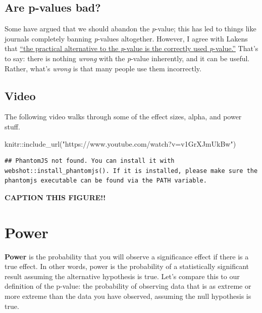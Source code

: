 \documentclass[
]{book}
\newenvironment{Shaded}{\begin{snugshade}}{\end{snugshade}}
\newcommand{\FunctionTok}[1]{\textcolor[rgb]{0.00,0.00,0.00}{#1}}
\newcommand{\NormalTok}[1]{#1}
\newcommand{\SpecialCharTok}[1]{\textcolor[rgb]{0.00,0.00,0.00}{#1}}
\newcommand{\StringTok}[1]{\textcolor[rgb]{0.31,0.60,0.02}{#1}}
\begin{document}
\hypertarget{are-p-values-bad}{%
\subsection{Are p-values bad?}\label{are-p-values-bad}}

Some have argued that we should abandon the \emph{p}-value; this has led to things like journals completely banning \emph{p}-values altogether. However, I agree with Lakens that \href{https://psyarxiv.com/shm8v/}{``the practical alternative to the \emph{p}-value is the correctly used \emph{p}-value.''} That's to say: there is nothing \emph{wrong} with the \emph{p}-value inherently, and it can be useful. Rather, what's \emph{wrong} is that many people use them incorrectly.

\hypertarget{video}{%
\subsection{Video}\label{video}}

The following video walks through some of the effect sizes, alpha, and power stuff.

\begin{Shaded}
\begin{Highlighting}[]
\NormalTok{knitr}\SpecialCharTok{::}\FunctionTok{include\_url}\NormalTok{(}\StringTok{"https://www.youtube.com/watch?v=v1GrXJmUkBw"}\NormalTok{)}
\end{Highlighting}
\end{Shaded}

\begin{verbatim}
## PhantomJS not found. You can install it with webshot::install_phantomjs(). If it is installed, please make sure the phantomjs executable can be found via the PATH variable.
\end{verbatim}

\label{fig:unnamed-chunk-2}\textbf{CAPTION THIS FIGURE!!}

\hypertarget{power}{%
\section{Power}\label{power}}

\textbf{Power} is the probability that you will observe a significance effect if there is a true effect. In other words, power is the probability of a statistically significant result assuming the alternative hypothesis is true. Let's compare this to our definition of the p-value: the probability of observing data that is as extreme or more extreme than the data you have observed, assuming the null hypothesis is true.
\end{document}
